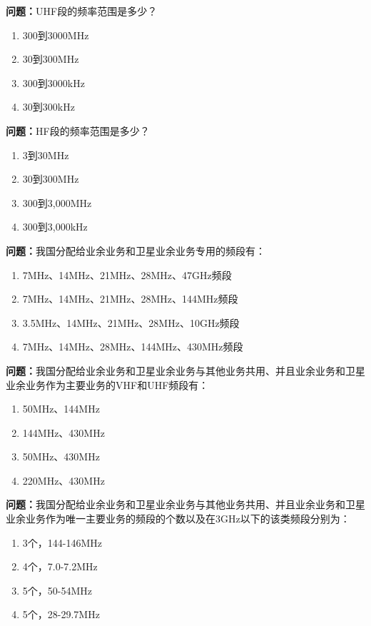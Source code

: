 \documentclass{ctexbook}%
\begin{document}
\textbf{问题：}UHF段的频率范围是多少？
\begin{enumerate}[label=\Alph*), leftmargin=3em]
\item 300到3000MHz
\item 30到300MHz
\item 300到3000kHz
\item 30到300kHz
\end{enumerate}

\textbf{问题：}HF段的频率范围是多少？
\begin{enumerate}[label=\Alph*), leftmargin=3em]
\item 3到30MHz
\item 30到300MHz
\item 300到3,000MHz
\item 300到3,000kHz
\end{enumerate}

\textbf{问题：}我国分配给业余业务和卫星业余业务专用的频段有：
\begin{enumerate}[label=\Alph*), leftmargin=3em]
\item 7MHz、14MHz、21MHz、28MHz、47GHz频段
\item 7MHz、14MHz、21MHz、28MHz、144MHz频段
\item 3.5MHz、14MHz、21MHz、28MHz、10GHz频段
\item 7MHz、14MHz、28MHz、144MHz、430MHz频段
\end{enumerate}

\textbf{问题：}我国分配给业余业务和卫星业余业务与其他业务共用、并且业余业务和卫星业余业务作为主要业务的VHF和UHF频段有：
\begin{enumerate}[label=\Alph*), leftmargin=3em]
\item 50MHz、144MHz
\item 144MHz、430MHz
\item 50MHz、430MHz
\item 220MHz、430MHz
\end{enumerate}

\textbf{问题：}我国分配给业余业务和卫星业余业务与其他业务共用、并且业余业务和卫星业余业务作为唯一主要业务的频段的个数以及在3GHz以下的该类频段分别为：
\begin{enumerate}[label=\Alph*), leftmargin=3em]
\item 3个，144-146MHz
\item 4个，7.0-7.2MHz
\item 5个，50-54MHz
\item 5个，28-29.7MHz
\end{enumerate}
\end{document}
